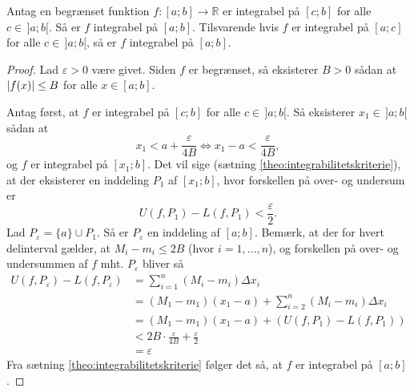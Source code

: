 \begin{theorem}[label=theo:integrabel_endepunkt]{}{}
  Antag en begrænset funktion $f:[a;b] \to \mathbb{R}$ er integrabel på $[c;b]$ for alle $c \in \,]a;b[$.
  Så er $f$ integrabel på $[a;b]$.
  Tilsvarende hvis $f$ er integrabel på $[a;c]$ for alle $c \in \,]a;b[$, så er $f$ integrabel på $[a;b]$.
\end{theorem}
\begin{proof} 
  Lad $\varepsilon >0$ være givet. 
  Siden $f$ er begrænset, så eksisterer $B>0$ sådan at $\abs{f(x)} \leq B$ for alle $x \in [a;b]$. 

  Antag først, at $f$ er integrabel på $[c;b]$ for alle $c \in \, ]a;b[$. 
  Så eksisterer $x_1 \in \,]a;b[$ sådan at
  \[
  x_1 < a + \frac{\varepsilon }{4 B} \iff x_1 - a < \frac{\varepsilon }{4 B}, 
  \] 
  og $f$ er integrabel på $[x_1;b]$.
  Det vil sige (sætning \ref{theo:integrabilitetskriterie}), at der eksisterer en inddeling $P_1$ af $[x_1;b]$, hvor forskellen på over- og undersum er
  \[
  U(f, P_1)-L(f, P_1) < \frac{\varepsilon }{2}. 
  \] 
  Lad $P _{\varepsilon }=\{ a \} \cup P_1$. 
  Så er $P _{\varepsilon }$ en inddeling af $[a;b]$. 
  Bemærk, at der for hvert delinterval gælder, at $M_i-m_i \leq 2 B$ (hvor $i=1, \ldots , n$), og forskellen på over- og undersummen af $f$ mht. $P _{\varepsilon }$ bliver så
  \begin{equation*}
  \begin{split}
    U(f, P_{\varepsilon })-L(f, P_{\varepsilon })&= \sum_{i  =1}^{n} (M_i - m_i) \Delta x_i \\
    &=(M_1-m_1)(x_1-a) + \sum_{i =2}^{n} (M_i - m_i) \Delta x_i \\
    &=(M_1-m_1)(x_1-a) +(U(f, P_1)-L(f, P_1)) \\
    &<2B \cdot \frac{\varepsilon }{4 B} + \frac{\varepsilon }{2}\\
    &=\varepsilon 
  \end{split}
  \end{equation*}
  Fra sætning \ref{theo:integrabilitetskriterie} følger det så, at $f$ er integrabel på $[a;b]$.


\end{proof}
